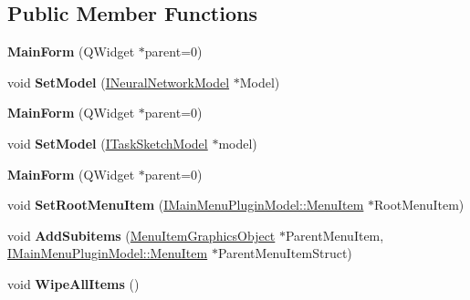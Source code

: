 \subsection*{Public Member Functions}
\begin{DoxyCompactItemize}
\item 
{\bfseries Main\+Form} (Q\+Widget $\ast$parent=0)\hypertarget{class_main_form_a8407ed1ab0a7b7bef115711157c8f344}{}\label{class_main_form_a8407ed1ab0a7b7bef115711157c8f344}

\item 
void {\bfseries Set\+Model} (\hyperlink{class_i_neural_network_model}{I\+Neural\+Network\+Model} $\ast$Model)\hypertarget{class_main_form_a69da72ae01b90a41559c050e81020135}{}\label{class_main_form_a69da72ae01b90a41559c050e81020135}

\item 
{\bfseries Main\+Form} (Q\+Widget $\ast$parent=0)\hypertarget{class_main_form_a8407ed1ab0a7b7bef115711157c8f344}{}\label{class_main_form_a8407ed1ab0a7b7bef115711157c8f344}

\item 
void {\bfseries Set\+Model} (\hyperlink{class_i_task_sketch_model}{I\+Task\+Sketch\+Model} $\ast$model)\hypertarget{class_main_form_a4d6783977b0be48e1523fd03d836e64b}{}\label{class_main_form_a4d6783977b0be48e1523fd03d836e64b}

\item 
{\bfseries Main\+Form} (Q\+Widget $\ast$parent=0)\hypertarget{class_main_form_a8407ed1ab0a7b7bef115711157c8f344}{}\label{class_main_form_a8407ed1ab0a7b7bef115711157c8f344}

\item 
void {\bfseries Set\+Root\+Menu\+Item} (\hyperlink{struct_i_main_menu_plugin_model_1_1_menu_item}{I\+Main\+Menu\+Plugin\+Model\+::\+Menu\+Item} $\ast$Root\+Menu\+Item)\hypertarget{class_main_form_a6d1caba5273f012fa93e93bc5b259e16}{}\label{class_main_form_a6d1caba5273f012fa93e93bc5b259e16}

\item 
void {\bfseries Add\+Subitems} (\hyperlink{class_menu_item_graphics_object}{Menu\+Item\+Graphics\+Object} $\ast$Parent\+Menu\+Item, \hyperlink{struct_i_main_menu_plugin_model_1_1_menu_item}{I\+Main\+Menu\+Plugin\+Model\+::\+Menu\+Item} $\ast$Parent\+Menu\+Item\+Struct)\hypertarget{class_main_form_aab382edeb9cf6c08dd2773f63268ea3d}{}\label{class_main_form_aab382edeb9cf6c08dd2773f63268ea3d}

\item 
void {\bfseries Wipe\+All\+Items} ()\hypertarget{class_main_form_a27f6000033cf622a9629b82927055c95}{}\label{class_main_form_a27f6000033cf622a9629b82927055c95}


\end{DoxyCompactItemize}
